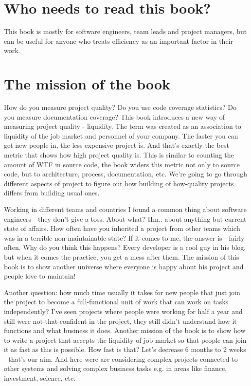 \section{Who needs to read this book?}
This book is mostly for software engineers, team leads and project managers, but can be useful for anyone who treats efficiency as an important factor in their work.

\section{The mission of the book}
How do you measure project quality? Do you use code coverage statistics? Do you measure documentation coverage? This book introduces a new way of measuring project quality - liquidity. The term was created as an association to liquidity of the job market and personnel of your company. The faster you can get new people in, the less expensive project is. And that's exactly the best metric that shows how high project quality is. This is similar to counting the amount of WTF in source code, the book widers this metric not only to source code, but to architecture, process, documentation, etc. We're going to go through different aspects of project to figure out how building of how-quality projects differs from building usual ones.

Working in different teams and countries I found a common thing about software engineers - they don't give a toss. About what? Hm.. about anything but current state of affairs. How often have you inherited a project from other teams which was in a terrible non-maintainable state? If it comes to me, the answer is - fairly often. Why do you think this happens? Every developer is a cool guy in his blog, but when it comes the practice, you get a mess after them. The mission of this book is to show another universe where everyone is happy about his project and people love to maintain! 

Another question: how much time usually it takes for new people that just join the project to become a full-functional unit of work that can work on tasks independently? I've seen projects where people were working for half a year and still were not-that-confident in the project, they still didn't understand how it functions and what business it does. Another mission of the book is to show how to write a project that accepts the liquidity of job market so that people can join it as fast as this is possible. How fast is that? Let's decrease 6 months to 2 weeks - that's our aim. And here were are considering complex projects connected to other systems and solving complex business tasks e.g. in areas like finance, investment, science, etc.

